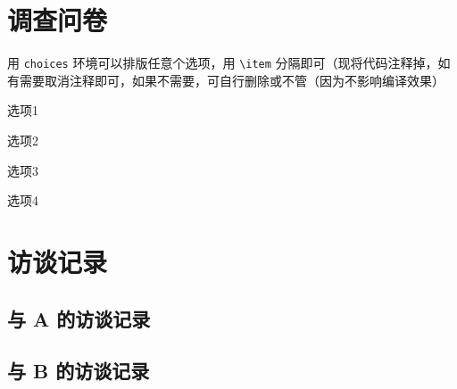 
\appendix


\chapter{调查问卷}

用 \verb|choices| 环境可以排版任意个选项，用 \verb|\item| 分隔即可（现将代码注释掉，如有需要取消注释即可，如果不需要，可自行删除或不管（因为不影响编译效果）

\begin{choices}
  \item 选项1
  \item 选项2
  \item 选项3
  \item 选项4
\end{choices}





\chapter{访谈记录}


\section{与 A 的访谈记录}

\section{与 B 的访谈记录}
